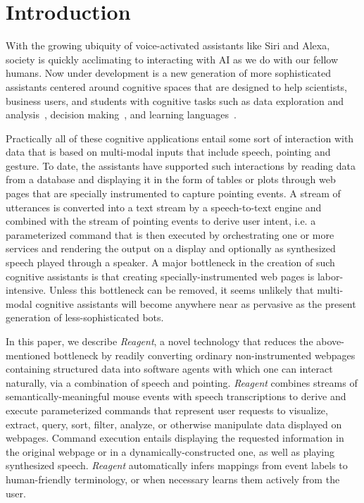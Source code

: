 \section{Introduction}

With the growing ubiquity of voice-activated assistants like Siri and Alexa, society is
quickly acclimating to interacting with AI as we do with our fellow humans. Now under development is
a new generation of more sophisticated assistants centered around 
cognitive spaces that are designed to help scientists, business users, and students with
cognitive tasks such as data exploration and analysis~\cite{kephart_embodied_2019}, decision making~\cite{farrell_symbiotic_2016}, and learning languages~\cite{allen_rensselaer_2019}.

Practically all of these cognitive applications entail some sort of interaction with data that
is based on multi-modal inputs that include speech, pointing and gesture. To date, the assistants have 
supported such interactions by reading data from a database and displaying it in the form of tables or 
plots through web pages that are specially instrumented to capture pointing events. A stream of utterances 
is converted into a text stream by a speech-to-text engine and combined with the stream of pointing events 
to derive user intent, i.e. a parameterized command that is then executed by orchestrating one or more services 
and rendering the output on a display and optionally as synthesized speech played through a speaker. A 
major bottleneck in the creation of such cognitive assistants is that creating specially-instrumented web 
pages is labor-intensive. Unless this bottleneck can be removed, it seems unlikely that multi-modal cognitive
assistants will become anywhere near as pervasive as the present generation of less-sophisticated bots.

In this paper, we describe \textit{Reagent}, a novel technology that reduces the above-mentioned bottleneck by
readily converting ordinary non-instrumented webpages containing structured data into
software agents with which one can interact naturally, via a combination of speech and
pointing. \textit{Reagent} combines streams of semantically-meaningful mouse events with
speech transcriptions to derive and execute parameterized commands that represent user
requests to visualize, extract, query, sort, filter, analyze, or otherwise manipulate data
displayed on webpages. Command execution entails displaying the requested information in the
original webpage or in a dynamically-constructed one, as well as playing synthesized speech.
\textit{Reagent} automatically infers mappings from event labels to human-friendly terminology,
or when necessary learns them actively from the user. 

